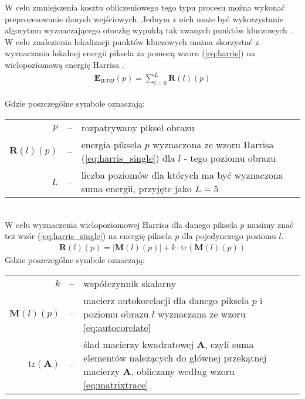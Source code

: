 		W celu zmniejszenia kosztu obliczeniowego tego typu procesu można wykonać preprocesowanie danych wejściowych. Jednym z nich może być wykorzystanie algorytmu wyznaczającego otoczkę wypukłą tak zwanych punktów kluczowych \cite{detection}. W celu znalezienia lokalizacji punktów kluczowych można skorzystać z wyznaczania lokalnej energii piksela za pomocą wzoru (\ref{eq:harris}) na wielopoziomową energię Harrisa \cite{detection, harris}. 
		\begin{align}\label{eq:harris}  
			\textbf{E}_{WPH}\left(p\right) = \sum_{l=0}^{L}\textbf{R}\left(l\right)\left(p\right)	 		
        \end{align}\\[-5 pt]
        Gdzie poszczególne symbole oznaczają:\\[10 pt]
       \begin{tabular}{rcl}
    	$p$ & -- & rozpatrywany piksel obrazu\\
		$\textbf{R}\left(l\right)\left(p\right)$ & -- &  \begin{minipage}[t]{123 mm} energia piksela $p$ wyznaczona ze wzoru Harrisa (\ref{eq:harris_single}) dla $l$ - tego poziomu obrazu \end{minipage} \\[20 pt] 
		$L$ & -- & \begin{minipage}[t]{123 mm}
		liczba poziomów dla których ma być wyznaczona suma energii, przyjęte jako $L=5$ \cite{detection}
		\end{minipage}
		
    	\end{tabular}\\[15 pt]
    	W celu wyznaczenia wielopoziomowej Harrisa dla danego piksela $p$ musimy znać też wzór (\ref{eq:harris_single}) na energię piksela $p$ dla pojedynczego poziomu $l$.
    	\begin{align}\label{eq:harris_single}  
		\textbf{R}\left(l\right)\left(p\right) =
		\left|\textbf{M}\left(l\right)\left(p\right)\right| + k \cdot \mathrm{tr}\left(\textbf{M}\left(l\right)\left(p\right)\right)
        \end{align}
Gdzie poszczególne symbole oznaczają:\\[10 pt]
        \begin{tabular}{rcl}
    	$k$ & -- & współczynnik skalarny\\
    	$\textbf{M}\left(l\right)\left(p\right)$ & -- & 
    	\begin{minipage}[t]{121 mm}
    	macierz autokorelacji dla danego piksela $p$ i poziomu obrazu $l$ wyznaczana ze wzoru \ref{eq:autocorelate} \cite{harrispptx, harris, detection}
    	\end{minipage}\\[20 pt]
    	$\mathrm{tr}\left(\textbf{A}\right)$ & -- & 
    	\begin{minipage}[t]{121 mm}
    	ślad macierzy kwadratowej $\textbf{A}$, czyli suma elementów należących do głównej przekątnej macierzy $\textbf{A}$, obliczany według wzoru \ref{eq:matrixtrace} \cite{matrixtrace, matrixtrace2}
    	\end{minipage}
    	\end{tabular}\\[10 pt]
